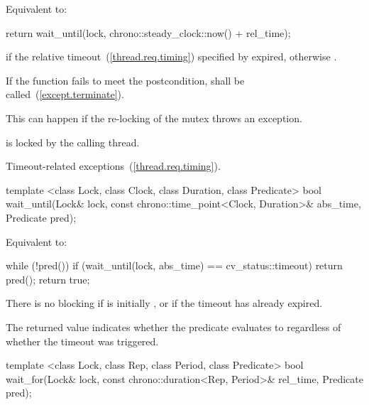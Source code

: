 \begin{itemdescr}
\pnum
\effects Equivalent to:
\begin{codeblock}
return wait_until(lock, chrono::steady_clock::now() + rel_time);
\end{codeblock}

\pnum
\returns {} if
the relative timeout~(\ref{thread.req.timing}) specified by  expired,
otherwise .

\pnum
\remarks
If the function fails to meet the postcondition, 
shall be called~(\ref{except.terminate}).
\begin{note} This can happen if the re-locking of the mutex throws an exception. \end{note}

\pnum
\postcondition {} is locked by the calling thread.

\pnum
\throws Timeout-related
exceptions~(\ref{thread.req.timing}).

\end{itemdescr}

%
%
\begin{itemdecl}
template <class Lock, class Clock, class Duration, class Predicate>
  bool wait_until(Lock& lock, const chrono::time_point<Clock, Duration>& abs_time, Predicate pred);
\end{itemdecl}

\begin{itemdescr}
\pnum
\effects Equivalent to:
\begin{codeblock}
while (!pred())
  if (wait_until(lock, abs_time) == cv_status::timeout)
    return pred();
return true;
\end{codeblock}

\pnum
\begin{note} There is no blocking if  is initially , or
if the timeout has already expired. \end{note}

\pnum
\begin{note} The returned value indicates whether the predicate evaluates to 
regardless of whether the timeout was triggered. \end{note}
\end{itemdescr}

%
%
\begin{itemdecl}
template <class Lock, class Rep, class Period, class Predicate>
  bool wait_for(Lock& lock, const chrono::duration<Rep, Period>& rel_time, Predicate pred);
\end{itemdecl}

